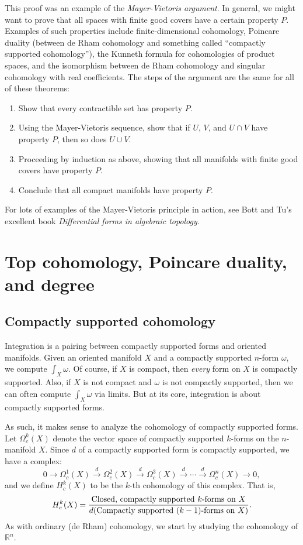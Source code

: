 \documentclass[12pt]{amsbook}
\newcommand{\R}{{\mathbb R}}
\theoremstyle{definition}
\begin{document}
This proof was an example of the {\em Mayer-Vietoris argument}. In general, we might want to prove that all 
spaces with finite good covers have a certain property $P$. Examples of such properties include finite-dimensional cohomology, 
Poincare duality (between de Rham cohomology and something called ``compactly supported cohomology''), the Kunneth formula for cohomologies of product spaces, and the isomorphism between de Rham cohomology and singular cohomology with 
real coefficients. The steps of the argument are the same for all of these theorems:
\begin{enumerate}
\item Show that every contractible set has property $P$. 
\item Using the Mayer-Vietoris sequence, show that if $U$, $V$, and $U\cap V$ have property $P$, then so does
 $U \cup V$. 
 \item Proceeding by induction as above, showing that all manifolds with finite good covers have property $P$. 
\item Conclude that all compact manifolds have property $P$. 
\end{enumerate}
For lots of examples of the Mayer-Vietoris principle in action, see Bott and Tu's excellent book {\em Differential forms in algebraic
topology}.

\chapter{Top cohomology, Poincare duality, and degree}

\section{Compactly supported cohomology}

Integration is a pairing between compactly supported forms and
oriented manifolds. Given an oriented manifold $X$ and a compactly 
supported $n$-form
$\omega$, we compute $\int_X\omega$. Of course, if $X$ is compact,
then {\em every} form on $X$ is compactly supported. Also, if $X$ is
not compact and $\omega$ is not compactly supported, then we can often
compute $\int_X \omega$ via limits.  But at its core, integration is
about compactly supported forms.

As such, it makes sense to analyze the cohomology of compactly
supported forms. Let $\Omega_c^k(X)$ denote the vector space of
compactly supported $k$-forms on the $n$-manifold $X$. Since $d$ of a
compactly supported form is compactly supported, we have a complex:
$$ 0 \to \Omega_c^1(X) \xrightarrow d \Omega_c^2(X) \xrightarrow d \Omega_c^3(X) \xrightarrow d \cdots 
\xrightarrow d \Omega_c^n(X) \to 0,$$ and we define $H_c^k(X)$ to be
the $k$-th cohomology of this complex. That is,
$$ H^k_c(X) = \frac{\hbox{Closed, compactly supported $k$-forms on }X}{d\hbox{(Compactly supported $(k-1)$-forms on }X)}.$$
As with ordinary (de Rham) cohomology, we start by studying the
cohomology of $\R^n$.
\end{document}
